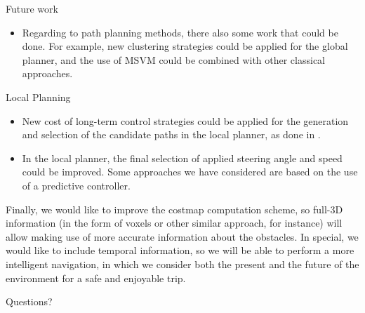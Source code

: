 \begin{frame}{Future work}
\begin{itemize}
{\begin{itemize}
      \item Regarding to path planning methods, there also some work that could be done. For example, new clustering strategies could be applied for the global planner, and the use of MSVM could be combined with other classical approaches.
    \end{itemize}
    \item Local Planning
    \begin{itemize}
      \item New cost of long-term control strategies could be applied for the generation and selection of the candidate paths in the local planner, as done in \cite{werling2010optimal}.
      \item In the local planner, the final selection of applied steering angle and speed could be improved. Some approaches we have considered are based on the use of a predictive controller.
    \end{itemize}
    }
     {
    \item Finally, we would like to improve the costmap computation scheme, so full-3D information (in the form of voxels or other similar approach, for instance) will allow making use of more accurate information about the obstacles. In special, we would like to include temporal information, so we will be able to perform a more intelligent navigation, in which we consider both the present and the future of the environment for a safe and enjoyable trip.
    }
  \end{itemize}
\end{frame}

{
\begin{frame}[plain]{Questions?}

\end{frame}
}
